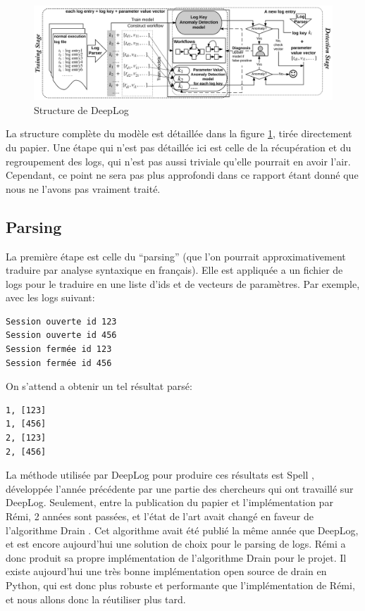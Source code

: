 \documentclass[openany, 11pt]{memoir}
\begin{document}
\begin{figure}[ht]
	\centering
	\includegraphics[width=\textwidth]{images/deeplog.png}
	\caption{Structure de DeepLog}
	\label{deeplog}
\end{figure}

La structure complète du modèle est détaillée dans la figure \ref{deeplog}, tirée directement du papier. Une étape qui n'est pas détaillée ici est celle de la récupération et du regroupement des \glspl{log}, qui n'est pas aussi triviale qu'elle pourrait en avoir l'air. Cependant, ce point ne sera pas plus approfondi dans ce rapport étant donné que nous ne l'avons pas vraiment traité.

\subsection{Parsing}

La première étape est celle du ``parsing'' (que l'on pourrait approximativement traduire par analyse syntaxique en français). Elle est appliquée a un fichier de \glspl{log} pour le traduire en une liste d'ids et de vecteurs de paramètres. Par exemple, avec les \glspl{log} suivant:

\begin{lstlisting}
Session ouverte id 123
Session ouverte id 456
Session fermée id 123
Session fermée id 456
\end{lstlisting}

On s'attend a obtenir un tel résultat parsé:

\begin{lstlisting}
1, [123]
1, [456]
2, [123]
2, [456]
\end{lstlisting}

La méthode utilisée par DeepLog pour produire ces résultats est Spell \cite{spell}, développée l'année précédente par une partie des chercheurs qui ont travaillé sur DeepLog. Seulement, entre la publication du papier et l'implémentation par Rémi, 2 années sont passées, et l'état de l'art avait changé en faveur de l'algorithme Drain \cite{drain}. Cet algorithme avait été publié la même année que DeepLog, et est encore aujourd'hui une solution de choix pour le parsing de \glspl{log}. Rémi a donc produit sa propre implémentation de l'algorithme Drain pour le projet. Il existe aujourd'hui une très bonne implémentation open source de drain en Python, qui est donc plus robuste et performante que l'implémentation de Rémi, et nous allons donc la réutiliser plus tard.
\end{document}
